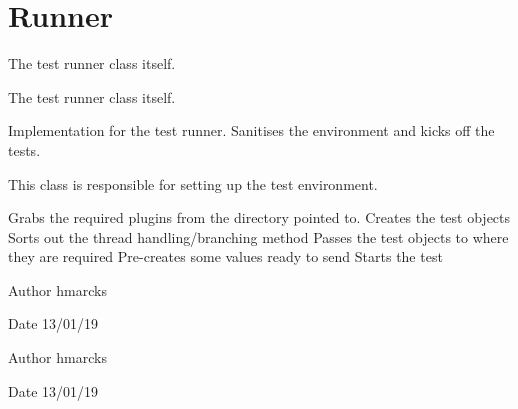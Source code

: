 \hypertarget{group__Test}{}\section{Runner}
\label{group__Test}


The test runner class itself.  


The test runner class itself. 

Implementation for the test runner. Sanitises the environment and kicks off the tests.

This class is responsible for setting up the test environment.

Grabs the required plugins from the directory pointed to. Creates the test objects Sorts out the thread handling/branching method Passes the test objects to where they are required Pre-\/creates some values ready to send Starts the test

\begin{DoxyAuthor}{Author}
hmarcks
\end{DoxyAuthor}
\begin{DoxyDate}{Date}
13/01/19
\end{DoxyDate}
\begin{DoxyAuthor}{Author}
hmarcks
\end{DoxyAuthor}
\begin{DoxyDate}{Date}
13/01/19 
\end{DoxyDate}
